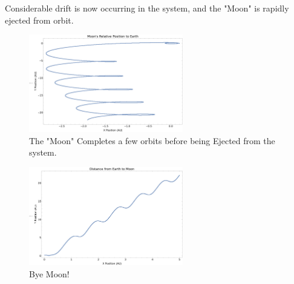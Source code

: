 \documentclass{article}
\begin{document}
Considerable drift is now occurring in the system, and the "Moon" is rapidly ejected from orbit.

\begin{figure}[!htb]
	\begin{center}
		\includegraphics[width=0.6\textwidth]{images/p1-4b.pdf}
	\end{center}
	\caption{The "Moon" Completes a few orbits before being Ejected from the system.}
\label{fig:qual}
\end{figure}
\FloatBarrier

\begin{figure}[!htb]
	\begin{center}
		\includegraphics[width=0.6\textwidth]{images/p1-4c.pdf}
	\end{center}
	\caption{Bye Moon!}
\label{fig:qual}
\end{figure}
\FloatBarrier
\end{document}
